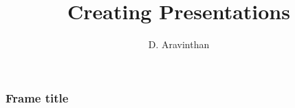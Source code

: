 \documentclass{beamer}
\title{Creating Presentations}
\author{D. Aravinthan}
\begin{document}
\begin{frame}
  \titlepage
\end{frame}
\begin{frame}
  \frametitle{Frame title}
\blindtext
\end{frame}
\begin{comment}
\end{comment}
\end{document}
